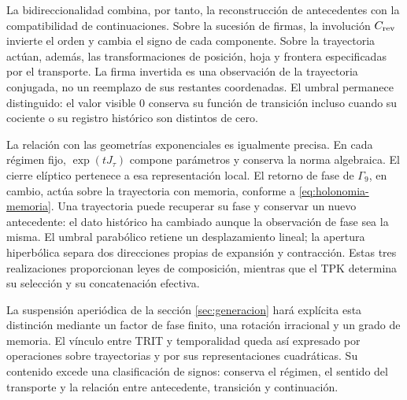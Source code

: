 La bidireccionalidad combina, por tanto, la reconstrucción de antecedentes
con la compatibilidad de continuaciones. Sobre la sucesión de firmas, la
involución \(C_{\rm rev}\) invierte el orden y cambia el signo de cada
componente. Sobre la trayectoria actúan, además, las transformaciones de
posición, hoja y frontera especificadas por el transporte. La firma
invertida es una observación de la trayectoria conjugada, no un reemplazo
de sus restantes coordenadas. El umbral permanece distinguido: el valor
visible \(0\) conserva su función de transición incluso cuando su cociente
o su registro histórico son distintos de cero.

La relación con las geometrías exponenciales es igualmente precisa. En
cada régimen fijo, \(\exp(tJ_\tau)\) compone parámetros y conserva la
norma algebraica. El cierre elíptico pertenece a esa representación local.
El retorno de fase de \(\Gamma_9\), en cambio, actúa sobre la trayectoria
con memoria, conforme a \eqref{eq:holonomia-memoria}. Una trayectoria puede
recuperar su fase y conservar un nuevo antecedente: el dato histórico ha
cambiado aunque la observación de fase sea la misma. El umbral parabólico
retiene un desplazamiento lineal; la apertura hiperbólica separa dos
direcciones propias de expansión y contracción. Estas tres realizaciones
proporcionan leyes de composición, mientras que el TPK determina su
selección y su concatenación efectiva.

La suspensión aperiódica de la sección \ref{sec:generacion} hará explícita
esta distinción mediante un factor de fase finito, una rotación irracional
y un grado de memoria. El vínculo entre TRIT y temporalidad queda así
expresado por operaciones sobre trayectorias y por sus representaciones
cuadráticas. Su contenido excede una clasificación de signos: conserva el
régimen, el sentido del transporte y la relación entre antecedente,
transición y continuación.
